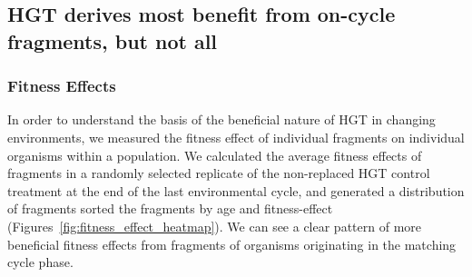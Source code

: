 \documentclass[PhD]{msu-thesis}
\begin{document}
\subsection{HGT derives most benefit from on-cycle fragments, but not all}



\subsubsection{Fitness Effects}
In order to understand the basis of the beneficial nature of HGT in changing environments, we measured the fitness effect of individual fragments on individual organisms within a population.
We calculated the average fitness effects of fragments in a randomly selected replicate of the non-replaced HGT control treatment at the end of the last environmental cycle, and generated a distribution of fragments sorted the fragments by age and fitness-effect (Figures~\ref{fig:fitness_effect_heatmap}). We can see a clear pattern of more beneficial fitness effects from fragments of organisms originating in the matching cycle phase. 
\end{document}

